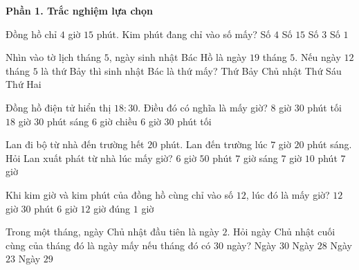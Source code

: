 \textbf{Phần 1. Trắc nghiệm lựa chọn}

\begin{ex} %
Đồng hồ chỉ $4$ giờ $15$ phút. Kim phút đang chỉ vào số mấy?
\choice
{Số $4$}
{Số $15$}
{\True Số $3$}
{Số $1$}
\end{ex}

\begin{ex} %
Nhìn vào tờ lịch tháng $5$, ngày sinh nhật Bác Hồ là ngày $19$ tháng $5$. Nếu ngày $12$ tháng $5$ là thứ Bảy thì sinh nhật Bác là thứ mấy?
\choice
{\True Thứ Bảy}
{Chủ nhật}
{Thứ Sáu}
{Thứ Hai}
\end{ex}

\begin{ex} %
Đồng hồ điện tử hiển thị $18:30$. Điều đó có nghĩa là mấy giờ?
\choice
{$8$ giờ $30$ phút tối}
{$18$ giờ $30$ phút sáng}
{$6$ giờ chiều}
{\True $6$ giờ $30$ phút tối}
\end{ex}

\begin{ex} %
Lan đi bộ từ nhà đến trường hết $20$ phút. Lan đến trường lúc $7$ giờ $20$ phút sáng. Hỏi Lan xuất phát từ nhà lúc mấy giờ?
\choice
{$6$ giờ $50$ phút}
{\True $7$ giờ sáng}
{$7$ giờ $10$ phút}
{$7$ giờ}
\end{ex}

\begin{ex} %
Khi kim giờ và kim phút của đồng hồ cùng chỉ vào số $12$, lúc đó là mấy giờ?
\choice
{$12$ giờ $30$ phút}
{$6$ giờ}
{\True $12$ giờ đúng}
{$1$ giờ}
\end{ex}

\begin{ex} %
Trong một tháng, ngày Chủ nhật đầu tiên là ngày $2$. Hỏi ngày Chủ nhật cuối cùng của tháng đó là ngày mấy nếu tháng đó có $30$ ngày?
\choice
{\True Ngày $30$}
{Ngày $28$}
{Ngày $23$}
{Ngày $29$}
\end{ex}

